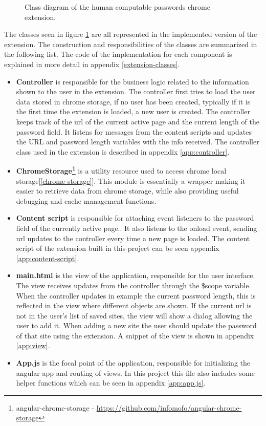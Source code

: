 \begin{figure}[h]
    \centering
    \caption{Class diagram of the human computable passwords chrome extension.}
    \label{class-diagram}
\end{figure}

\par The classes seen in figure \ref{class-diagram} are all represented in the implemented version of the extension. The construction and responsibilities of the classes are summarized in the following list. The code of the implementation for each component is explained in more detail in appendix \ref{extension-classes}.

\begin{itemize}
    \item \textbf{Controller} is responsible for the business logic related to the information shown to the user in the extension. The controller first tries to load the user data stored in chrome storage, if no user has been created, typically if it is the first time the extension is loaded, a new user is created. The controller keeps track of the url of the current active page and the current length of the password field. It listens for messages from the content scripts and updates the URL and password length variables with the info received. The controller class used in the extension is described in appendix \ref{app:controller}.
    \item \textbf{ChromeStorage\footnote{angular-chrome-storage - \url{https://github.com/infomofo/angular-chrome-storage}}} is a utility resource used to access chrome local storage[\autoref{chrome-storage}]. This module is essentially a wrapper making it easier to retrieve data from chrome storage, while also providing useful debugging and cache management functions.
    \item \textbf{Content script} is responsible for attaching event listeners to the password field of the currently active page.. It also listens to the onload event, sending url updates to the controller every time a new page is loaded. The content script of the extension built in this project can be seen appendix \ref{app:content-script}.
    \item \textbf{main.html} is the view of the application, responsible for the user interface. The view receives updates from the controller through the \$scope variable. When the controller updates in example the current password length, this is reflected in the view where different objects are shown. If the current url is not in the user's list of saved sites, the view will show a dialog allowing the user to add it. When adding a new site the user should update the password of that site using the extension. A snippet of the view is shown in appendix \ref{app:view}. 
    \item \textbf{App.js} is the focal point of the application, responsible for initializing the angular app and routing of views. In this project this file also includes some helper functions which can be seen in appendix \ref{app:app.js}.
\end{itemize}

